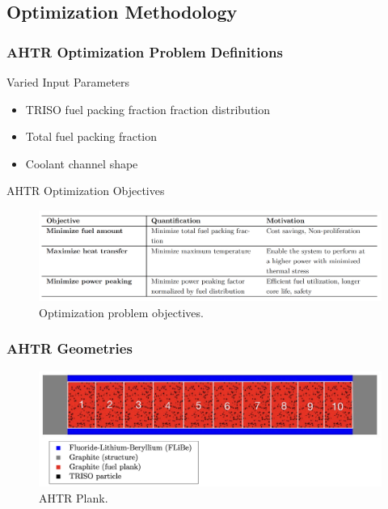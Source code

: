\subsection{Optimization Methodology}
\begin{frame}
    \frametitle{AHTR Optimization Problem Definitions}
    \begin{block}{Varied Input Parameters}
        \begin{itemize}
            \item TRISO fuel packing fraction fraction distribution 
            \item Total fuel packing fraction 
            \item Coolant channel shape 
        \end{itemize}
    \end{block}
    \begin{block}{AHTR Optimization Objectives}
        \begin{figure}
            \includegraphics[width=0.9\linewidth]{figures/ahtr-opt-obj.png} 
            \caption{Optimization problem objectives.}
        \end{figure}
    \end{block}
\end{frame}

\begin{frame}
    \frametitle{AHTR Geometries}
    \begin{figure}
        \includegraphics[width=0.9\linewidth]{figures/straightened-plank-pres.png} 
        \caption{AHTR Plank.}
    \end{figure}
\end{frame}

